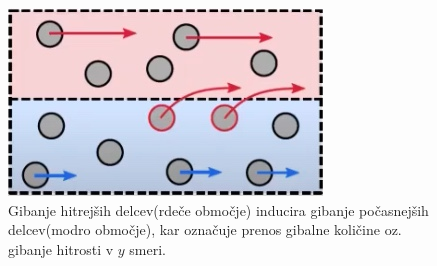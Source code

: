 \documentclass[mat2, tisk]{fmfdelo}
\begin{document}
\begin{figure}[h]
  \centering
\includegraphics[scale=0.45]{slike/Smag.jpg}
\caption{Gibanje hitrejših delcev(rdeče območje) inducira gibanje počasnejših delcev(modro območje), kar označuje prenos 
gibalne količine oz. gibanje hitrosti v $y$ smeri.}
\label{fig:reynolds}
\end{figure}
\end{document}
